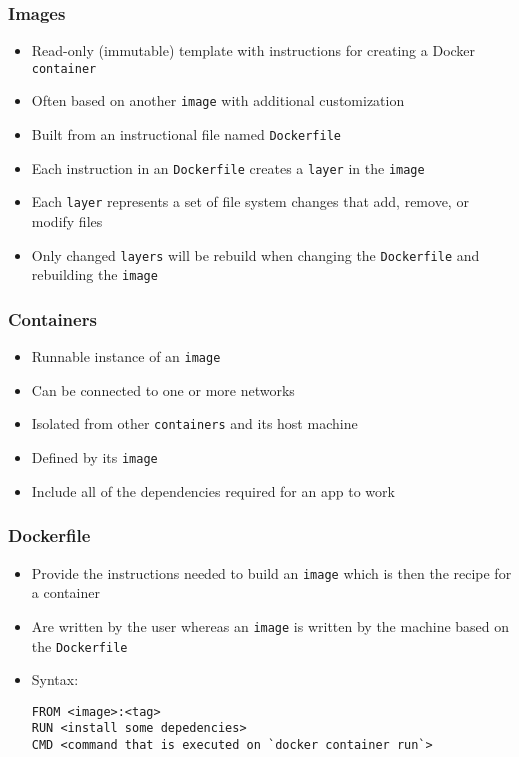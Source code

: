 \documentclass[11pt]{scrartcl}
\begin{document}
\subsubsection{Images} \label{images}
\begin{itemize}
	\item Read-only (immutable) template with instructions for creating a Docker \texttt{container}
	\item Often based on another \texttt{image} with additional customization
	\item Built from an instructional file named \texttt{Dockerfile}
	\item Each instruction in an \texttt{Dockerfile} creates a \texttt{layer} in the \texttt{image}
	\item Each \texttt{layer} represents a set of file system changes that add, remove, or modify files
	\item Only changed \texttt{layers} will be rebuild when changing the \texttt{Dockerfile} and rebuilding the \texttt{image}
\end{itemize}

\subsubsection{Containers} \label{containers}
\begin{itemize}
	\item Runnable instance of an \texttt{image}
	\item Can be connected to one or more networks
	\item Isolated from other \texttt{containers} and its host machine
	\item Defined by its \texttt{image}
	\item Include all of the dependencies required for an app to work
\end{itemize}

\subsubsection{Dockerfile} \label{dockerfile}
\begin{itemize}
	\item Provide the instructions needed to build an \texttt{image} which is then the recipe for a container
	\item Are written by the user whereas an \texttt{image} is written by the machine based on the \texttt{Dockerfile}
	\item Syntax:
	\begin{lstlisting}
FROM <image>:<tag>
RUN <install some depedencies>
CMD <command that is executed on `docker container run`>
	\end{lstlisting}
\end{itemize}
\end{document}
